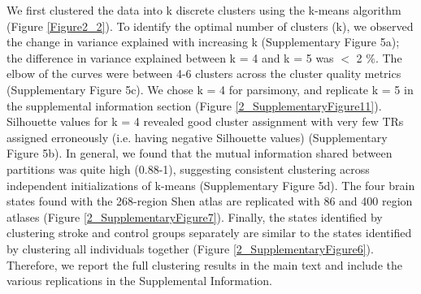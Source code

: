 \documentclass[phd,tocprelim]{cornell}
\begin{document}
	 We first clustered the data into k discrete clusters using the k-means algorithm (Figure \ref{Figure2_2}). To identify the optimal number of clusters (k), we observed the change in variance explained with increasing k (Supplementary Figure 5a); the difference in variance explained between k = 4 and k = 5 was $<$ 2 $\%$. The elbow of the curves were between 4-6 clusters across the cluster quality metrics (Supplementary Figure 5c).
	 We chose k = 4 for parsimony, and replicate k = 5 in the supplemental information section (Figure \ref{2_SupplementaryFigure11}). Silhouette values for k = 4 revealed good cluster assignment with very few TRs assigned erroneously (i.e. having negative Silhouette values) (Supplementary Figure 5b). In general, we found that the mutual information shared between partitions was quite high (0.88-1), suggesting consistent clustering across independent initializations of k-means (Supplementary Figure 5d). The four brain states found with the 268-region Shen atlas are replicated with 86 and 400 region atlases (Figure \ref{2_SupplementaryFigure7}). Finally, the states identified by clustering stroke and control groups separately are similar to the states identified by clustering all individuals together (Figure \ref{2_SupplementaryFigure6}). Therefore, we report the full clustering results in the main text and include the various replications in the Supplemental Information.
\end{document}
